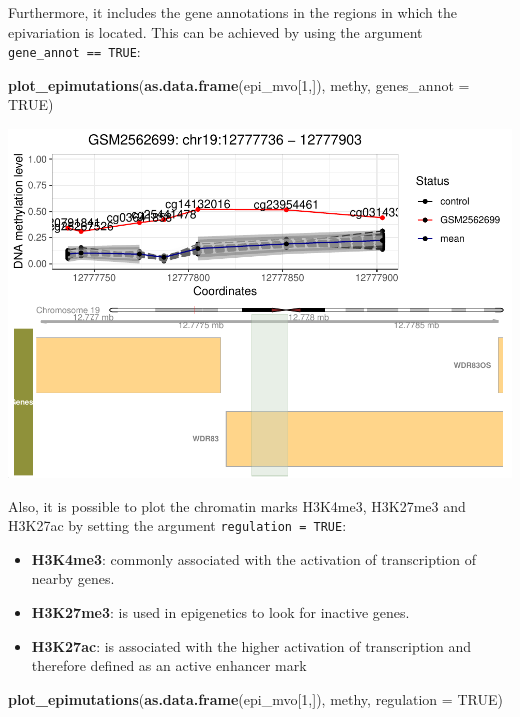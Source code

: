 \documentclass[
]{article}
\newenvironment{Shaded}{\begin{snugshade}}{\end{snugshade}}
\newcommand{\DataTypeTok}[1]{\textcolor[rgb]{0.13,0.29,0.53}{#1}}
\newcommand{\DecValTok}[1]{\textcolor[rgb]{0.00,0.00,0.81}{#1}}
\newcommand{\KeywordTok}[1]{\textcolor[rgb]{0.13,0.29,0.53}{\textbf{#1}}}
\newcommand{\NormalTok}[1]{#1}
\newcommand{\OtherTok}[1]{\textcolor[rgb]{0.56,0.35,0.01}{#1}}
\providecommand{\tightlist}{%
  \setlength{\itemsep}{0pt}\setlength{\parskip}{0pt}}
\begin{document}
Furthermore, it includes the gene annotations in the regions in which
the epivariation is located. This can be achieved by using the argument
\texttt{gene\_annot\ ==\ TRUE}:

\begin{Shaded}
\begin{Highlighting}[]
\KeywordTok{plot_epimutations}\NormalTok{(}\KeywordTok{as.data.frame}\NormalTok{(epi_mvo[}\DecValTok{1}\NormalTok{,]), methy, }\DataTypeTok{genes_annot =} \OtherTok{TRUE}\NormalTok{)}
\end{Highlighting}
\end{Shaded}

\includegraphics{sup_mat_files/figure-latex/plot_mvo_genes_annot-1.pdf}

Also, it is possible to plot the chromatin marks H3K4me3, H3K27me3 and
H3K27ac by setting the argument \texttt{regulation\ =\ TRUE}:

\begin{itemize}
\tightlist
\item
  \textbf{H3K4me3}: commonly associated with the activation of
  transcription of nearby genes.
\item
  \textbf{H3K27me3}: is used in epigenetics to look for inactive genes.
\item
  \textbf{H3K27ac}: is associated with the higher activation of
  transcription and therefore defined as an active enhancer mark
\end{itemize}

\begin{Shaded}
\begin{Highlighting}[]
\KeywordTok{plot_epimutations}\NormalTok{(}\KeywordTok{as.data.frame}\NormalTok{(epi_mvo[}\DecValTok{1}\NormalTok{,]), methy, }\DataTypeTok{regulation =} \OtherTok{TRUE}\NormalTok{)}
\end{Highlighting}
\end{Shaded}
\end{document}
